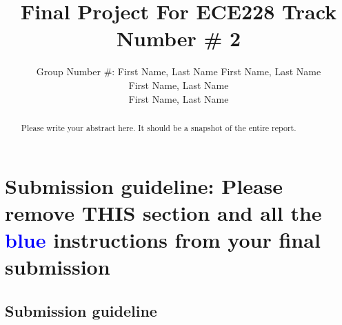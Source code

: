 \documentclass{article}
\title{Final Project For ECE228 Track Number \# 2}
\author{%
  Group Number \#: First Name, Last Name
  \And
  First Name, Last Name \\
  \And
  First Name, Last Name \\
  \And
  First Name, Last Name \\
}
\begin{document}
\maketitle

\begin{abstract}
Please write your abstract here. It should be a snapshot of the entire report.
\end{abstract}




\section*{Submission guideline: Please remove THIS section and all the \textcolor{blue}{blue} instructions from your final submission}
\subsection*{Submission guideline}
\end{document}
